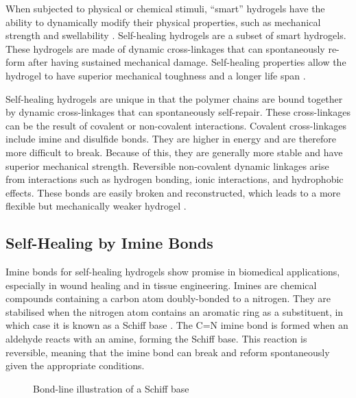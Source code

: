 When subjected to physical or chemical stimuli, ``smart'' hydrogels have the ability to dynamically modify their physical properties, such as mechanical strength and swellability \autocite{hoHydrogelsPropertiesApplications2022}.
Self-healing hydrogels are a subset of smart hydrogels. These hydrogels are made of dynamic cross-linkages that can spontaneously re-form after having sustained mechanical damage. Self-healing properties allow the hydrogel to have superior mechanical toughness and a longer life span \autocite{deviv.k.SelfHealingHydrogelsPreparation2021}.

Self-healing hydrogels are unique in that the polymer chains are bound together by dynamic cross-linkages that can spontaneously self-repair. These cross-linkages can be the result of covalent or non-covalent interactions.
Covalent cross-linkages include imine and disulfide bonds. They are higher in energy and are therefore more difficult to break. Because of this, they are generally more stable and have superior mechanical strength.
Reversible non-covalent dynamic linkages arise from interactions such as hydrogen bonding, ionic interactions, and hydrophobic effects. These bonds are easily broken and reconstructed, which leads to a more flexible but mechanically weaker hydrogel \autocite{deviv.k.SelfHealingHydrogelsPreparation2021}.

\subsection{Self-Healing by Imine Bonds}

Imine bonds for self-healing hydrogels show promise in biomedical applications, especially in wound healing and in tissue engineering. Imines are chemical compounds containing a carbon atom doubly-bonded to a nitrogen. They are stabilised when the nitrogen atom contains an aromatic ring as a substituent, in which case it is known as a Schiff base \autocite{moldoveanuChapter8Pyrolysis2019}.
The C=N imine bond is formed when an aldehyde reacts with an amine, forming the Schiff base. This reaction is reversible, meaning that the imine bond can break and reform spontaneously given the appropriate conditions.

\begin{figure}[ht]
    \centering
    \caption{Bond-line illustration of a Schiff base}
    \label{fig:schiff_base}
\end{figure}